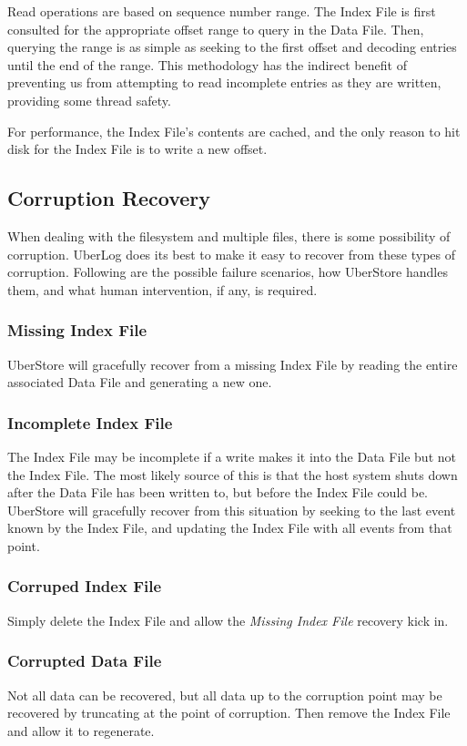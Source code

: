 \documentclass[11pt]{article}
\begin{document}
Read operations are based on sequence number range. The Index File is first consulted
for the appropriate offset range to query in the Data File.  Then, querying the range
is as simple as seeking to the first offset and decoding entries until the end of the
range.  This methodology has the indirect benefit of preventing us from attempting to
read incomplete entries as they are written, providing some thread safety.

For performance, the Index File's contents are cached, and the only reason to hit disk
for the Index File is to write a new offset.

\subsection{Corruption Recovery}
When dealing with the filesystem and multiple files, there is some possibility of
corruption. UberLog does its best to make it easy to recover from these types of
corruption. Following are the possible failure scenarios, how UberStore handles them,
and what human intervention, if any, is required.

\subsubsection{Missing Index File}
UberStore will gracefully recover from a missing Index File by reading the entire associated
Data File and generating a new one.

\subsubsection{Incomplete Index File}
The Index File may be incomplete if a write makes it into the Data File but not the Index
File. The most likely source of this is that the host system shuts down after the Data
File has been written to, but before the Index File could be. UberStore will gracefully
recover from this situation by seeking to the last event known by the Index File, and
updating the Index File with all events from that point.

\subsubsection{Corruped Index File}
Simply delete the Index File and allow the {\em Missing Index File} recovery kick in.

\subsubsection{Corrupted Data File}
Not all data can be recovered, but all data up to the corruption point may be recovered
by truncating at the point of corruption. Then remove the Index File and allow it to
regenerate.
\end{document}
